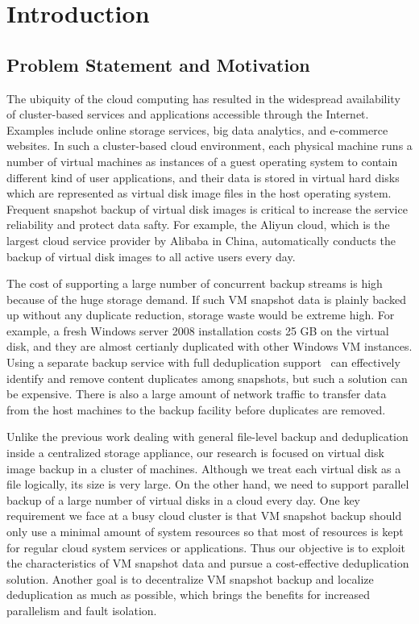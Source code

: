 \chapter{Introduction}
\label{chap:intro}
\section{Problem Statement and Motivation}
\label{intro:prob}
The ubiquity of the cloud computing has resulted in the 
widespread availability of cluster-based services and applications accessible through 
the Internet. Examples include online storage services, big data analytics, and e-commerce websites.
In such a cluster-based cloud environment,
each physical machine runs a number of virtual machines as  instances of a guest operating system 
to contain different kind of user applications,
and their data is stored in virtual hard disks which are represented 
as virtual disk image files in the host operating system.
Frequent snapshot backup of virtual disk images is critical to increase  the service reliability
and protect data safty.
For example, the Aliyun cloud, which is  the largest cloud service provider by Alibaba in China, 
automatically conducts  the backup of virtual disk images to all active users every day.

The cost of supporting a large number of concurrent backup streams is high
because of the huge storage demand. 
If such VM snapshot data is plainly backed up without any duplicate reduction, storage waste would be 
extreme high. For example, a fresh Windows server 2008 installation costs 25 GB on the virtual disk,
and they are almost certianly duplicated with other Windows VM instances\cite{common07, pedal96}.
Using a separate  backup service with full deduplication support~\cite{venti02,bottleneck08}
can effectively identify and remove content duplicates among snapshots, 
but such a solution can be expensive. There is also a large amount of 
network traffic to transfer  data from the host machines to the backup facility
before duplicates are removed.

Unlike the previous work dealing with general file-level
backup and deduplication inside a centralized storage appliance, our research is focused on virtual
disk image backup in a cluster of machines. Although we treat each virtual disk as a
file logically, its size is very large. On the other hand, we need
to support parallel backup of a large number of virtual disks
in a cloud every day. One key requirement we face at a busy cloud cluster
 is that VM snapshot backup should only use a minimal
amount of system resources so that most of resources is kept
for regular cloud system services or applications. Thus our
objective is to exploit the characteristics of VM snapshot data
and pursue a cost-effective deduplication solution. Another
goal is to decentralize VM snapshot backup and localize
deduplication as much as possible, which brings the benefits
for increased parallelism and fault isolation.

